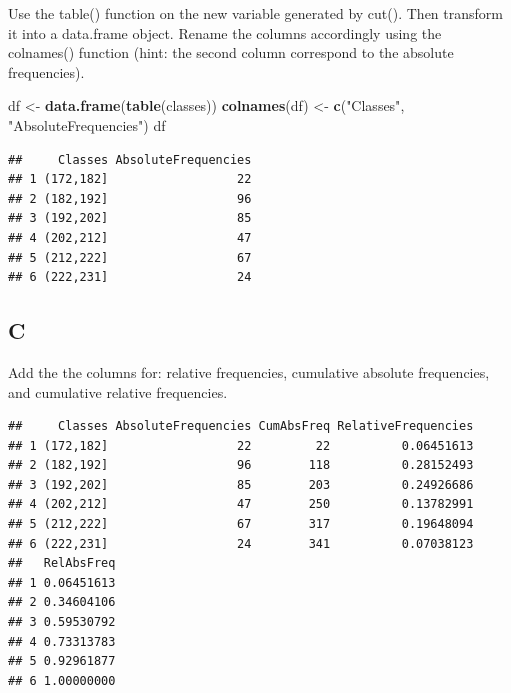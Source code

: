 \documentclass[
]{article}
\newenvironment{Shaded}{\begin{snugshade}}{\end{snugshade}}
\newcommand{\KeywordTok}[1]{\textcolor[rgb]{0.13,0.29,0.53}{\textbf{#1}}}
\newcommand{\NormalTok}[1]{#1}
\newcommand{\OperatorTok}[1]{\textcolor[rgb]{0.81,0.36,0.00}{\textbf{#1}}}
\newcommand{\StringTok}[1]{\textcolor[rgb]{0.31,0.60,0.02}{#1}}
\begin{document}
Use the table() function on the new variable generated by cut(). Then
transform it into a data.frame object. Rename the columns accordingly
using the colnames() function (hint: the second column correspond to the
absolute frequencies).

\begin{Shaded}
\begin{Highlighting}[]
\NormalTok{df \textless{}{-}}\StringTok{ }\KeywordTok{data.frame}\NormalTok{(}\KeywordTok{table}\NormalTok{(classes))}
\KeywordTok{colnames}\NormalTok{(df) \textless{}{-}}\StringTok{ }\KeywordTok{c}\NormalTok{(}\StringTok{"Classes"}\NormalTok{, }\StringTok{"AbsoluteFrequencies"}\NormalTok{)}
\NormalTok{df}
\end{Highlighting}
\end{Shaded}

\begin{verbatim}
##     Classes AbsoluteFrequencies
## 1 (172,182]                  22
## 2 (182,192]                  96
## 3 (192,202]                  85
## 4 (202,212]                  47
## 5 (212,222]                  67
## 6 (222,231]                  24
\end{verbatim}

\hypertarget{c-1}{%
\subsection{C}\label{c-1}}

Add the the columns for: relative frequencies, cumulative absolute
frequencies, and cumulative relative frequencies.

\begin{Shaded}
\end{Shaded}

\begin{verbatim}
##     Classes AbsoluteFrequencies CumAbsFreq RelativeFrequencies
## 1 (172,182]                  22         22          0.06451613
## 2 (182,192]                  96        118          0.28152493
## 3 (192,202]                  85        203          0.24926686
## 4 (202,212]                  47        250          0.13782991
## 5 (212,222]                  67        317          0.19648094
## 6 (222,231]                  24        341          0.07038123
##   RelAbsFreq
## 1 0.06451613
## 2 0.34604106
## 3 0.59530792
## 4 0.73313783
## 5 0.92961877
## 6 1.00000000
\end{verbatim}
\end{document}
